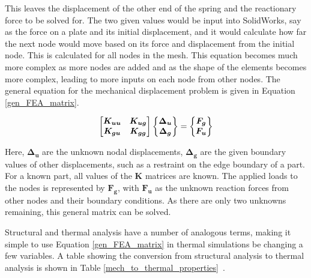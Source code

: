 This leaves the displacement of the other end of the spring and the reactionary force to be solved for. The two given values would be input into SolidWorks, say as the force on a plate and its initial displacement, and it would calculate how far the next node would move based on its force and displacement from the initial node. This is calculated for all nodes in the mesh. This equation becomes much more complex as more nodes are added and as the shape of the elements becomes more complex, leading to more inputs on each node from other nodes. The general equation for the mechanical displacement problem is given in Equation \ref{gen_FEA_matrix}.

\begin{equation} \label{gen_FEA_matrix}
\begingroup \boldmath
    \begin{bmatrix}
        K_{uu} & K_{ug} \\
        K_{gu} & K_{gg}
    \end{bmatrix}
    \begin{Bmatrix}
        \Delta_u \\
        \Delta_g \\
    \end{Bmatrix}
    =
    \begin{Bmatrix}
        F_g \\
        F_u \\
    \end{Bmatrix}
\endgroup
\end{equation}

Here, $\bm{\Delta_u}$ are the unknown nodal displacements, $\bm{\Delta_g}$ are the given boundary values of other displacements, such as a restraint on the edge boundary of a part. For a known part, all values of the $\bm{K}$ matrices are known. The applied loads to the nodes is represented by $\bm{F_g}$, with $\bm{F_u}$ as the unknown reaction forces from other nodes and their boundary conditions. As there are only two unknowns remaining, this general matrix can be solved. 

Structural and thermal analysis have a number of analogous terms, making it simple to use Equation \ref{gen_FEA_matrix} in thermal simulations be changing a few variables. A table showing the conversion from structural analysis to thermal analysis is shown in Table \ref{mech_to_thermal_properties}~\citep{FEA_SW}.

